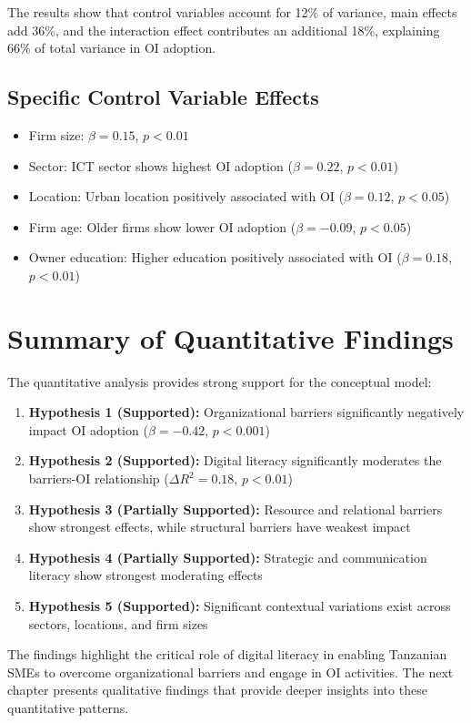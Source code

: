 The results show that control variables account for 12\% of variance, main effects add 36\%, and the interaction effect contributes an additional 18\%, explaining 66\% of total variance in OI adoption.

\subsection{Specific Control Variable Effects}
\begin{itemize}
    \item Firm size: $\beta = 0.15$, $p < 0.01$
    \item Sector: ICT sector shows highest OI adoption ($\beta = 0.22$, $p < 0.01$)
    \item Location: Urban location positively associated with OI ($\beta = 0.12$, $p < 0.05$)
    \item Firm age: Older firms show lower OI adoption ($\beta = -0.09$, $p < 0.05$)
    \item Owner education: Higher education positively associated with OI ($\beta = 0.18$, $p < 0.01$)
\end{itemize}

\section{Summary of Quantitative Findings}

The quantitative analysis provides strong support for the conceptual model:

\begin{enumerate}
    \item \textbf{Hypothesis 1 (Supported):} Organizational barriers significantly negatively impact OI adoption ($\beta = -0.42$, $p < 0.001$)
    \item \textbf{Hypothesis 2 (Supported):} Digital literacy significantly moderates the barriers-OI relationship ($\Delta R^2 = 0.18$, $p < 0.01$)
    \item \textbf{Hypothesis 3 (Partially Supported):} Resource and relational barriers show strongest effects, while structural barriers have weakest impact
    \item \textbf{Hypothesis 4 (Partially Supported):} Strategic and communication literacy show strongest moderating effects
    \item \textbf{Hypothesis 5 (Supported):} Significant contextual variations exist across sectors, locations, and firm sizes
\end{enumerate}

The findings highlight the critical role of digital literacy in enabling Tanzanian SMEs to overcome organizational barriers and engage in OI activities. The next chapter presents qualitative findings that provide deeper insights into these quantitative patterns.